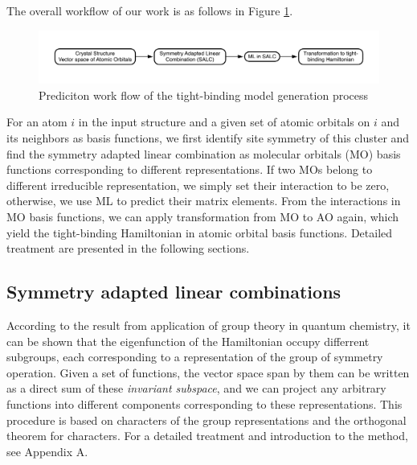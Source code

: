 \documentclass{article}
\begin{document}
The overall workflow of our work is as follows in Figure \ref{F:forward_workflow}.
\begin{figure}[h]
    \centering
    \includegraphics[width=5in]{figures/forward_workflow.pdf}
    \caption{Prediciton work flow of the tight-binding model generation process}
    \label{F:forward_workflow}
\end{figure}
For an atom $i$ in the input structure and a given set of atomic orbitals on $i$ and its neighbors as basis functions, 
we first identify site symmetry of this cluster and find the symmetry adapted linear combination as molecular orbitals (MO) basis 
functions corresponding to different representations. If two MOs belong to different irreducible representation, we simply 
set their interaction to be zero, otherwise, we use ML to predict their matrix elements. 
From the interactions in MO basis functions, we can apply transformation from MO to AO again, which yield the tight-binding 
Hamiltonian in atomic orbital basis functions.
Detailed treatment are presented in the following sections. 

\subsection{Symmetry adapted linear combinations}
According to the result from application of group theory in quantum chemistry, it can be 
shown that the eigenfunction of the Hamiltonian occupy differrent subgroups, each 
corresponding to a representation of the group of symmetry operation. Given a set of 
functions, the vector space span by them can be written as a direct sum of these 
\emph{invariant subspace}, and we can project any arbitrary functions into different 
components corresponding to these representations. This procedure is based on characters 
of the group representations and the orthogonal theorem for characters\cite{dresselhaus_group_2008}. 
For a detailed treatment and introduction to the method, see Appendix A.
\end{document}
